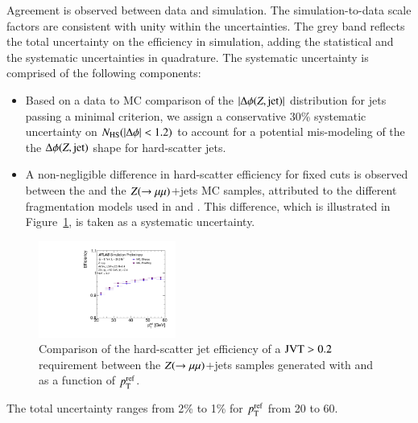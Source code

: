 \documentclass{atlasnote}
\begin{document}
Agreement is observed between data and simulation.
The simulation-to-data scale factors are consistent with unity within the uncertainties. 
The grey band reflects the total uncertainty on the efficiency in simulation, adding the statistical and the systematic uncertainties in quadrature. The systematic
uncertainty is comprised of the following components:
\begin{itemize}
    \item   Based on a data to MC comparison of the $|\Delta \phi (Z, {\rm jet})|$ distribution for jets passing a minimal \JVT criterion, 
        we assign a conservative  30\% systematic uncertainty on $N_{\rm{HS}}(|\Delta \phi|<1.2)$ to account for a potential mis-modeling of the 
            the $\Delta \phi(Z, {\rm jet})$ shape for hard-scatter jets.
        \item   A non-negligible difference in hard-scatter efficiency for fixed \JVT cuts is observed between the \Sherpa and the \Powheg $Z(\rightarrow\mu\mu)$+jets MC samples, 
        attributed to the different fragmentation models used in \Sherpa and \PYTHIAeight. This difference, which is illustrated in Figure~\ref{fig:JVTeff_Syst},
            is taken as a systematic uncertainty.
\end{itemize}
\begin{figure}[!htbp]
  \centering
  \includegraphics[width= 0.4\textwidth]{JVTEfficiency_SherpaVSPowHeg_JVTgt0p2}
  \caption{Comparison of the hard-scatter jet efficiency of a ${\rm JVT}>0.2$ requirement between the $Z(\rightarrow\mu\mu)$+jets samples generated with \Sherpa and \Powheg
  as a function of $p_{\mathrm{T}}^{\rm ref}$.}
  \label{fig:JVTeff_Syst}
\end{figure}
The total uncertainty ranges from 2\% to 1\% for $p_{\mathrm{T}}^{\rm ref}$ from 20 to 60\GeV. 
\end{document}
